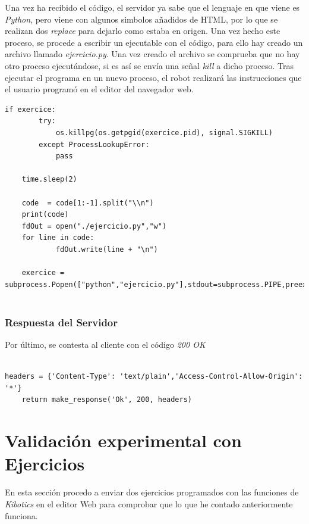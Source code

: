 Una vez ha recibido el código, el servidor ya sabe que el lenguaje en que viene es \textit{Python}, pero viene con algunos simbolos añadidos de HTML, por lo que se realizan dos \textit{replace} para dejarlo como estaba en origen.\newline
Una vez hecho este proceso, se procede a escribir un ejecutable con el código, para ello hay creado un archivo llamado \textit{ejercicio.py}.
Una vez creado el archivo se comprueba que no hay otro proceso ejecutándose, si es así se envía una señal \textit{kill} a dicho proceso.
Tras ejecutar el programa en un nuevo proceso, el robot realizará las instrucciones que el usuario programó en el editor del navegador web.
\\
\begin{lstlisting}[frame=single,breaklines=true, label=Creación del proceso con el programa para el robot, caption=Creación del proceso con el programa para el robot,  captionpos=b]
if exercice:
        try:
            os.killpg(os.getpgid(exercice.pid), signal.SIGKILL)
        except ProcessLookupError:
            pass

    time.sleep(2)
  
    code  = code[1:-1].split("\\n")
    print(code)
    fdOut = open("./ejercicio.py","w")
    for line in code:
            fdOut.write(line + "\n")
    
    exercice = subprocess.Popen(["python","ejercicio.py"],stdout=subprocess.PIPE,preexec_fn=os.setsid)
    
\end{lstlisting}

\subsubsection{Respuesta del Servidor}

Por último, se contesta al cliente con el código \textit{200 OK} 

\begin{lstlisting}[frame=single,breaklines=true, label=Respuesta del Servidor, caption=Creación del proceso con el programa para el robot,  captionpos=b]

headers = {'Content-Type': 'text/plain','Access-Control-Allow-Origin': '*'}
    return make_response('Ok', 200, headers)

\end{lstlisting}



\section{Validación experimental con Ejercicios}
En esta sección procedo a enviar dos ejercicios programados con las funciones de \textit{Kibotics} en el editor Web  para comprobar que lo que he contado anteriormente funciona. 
